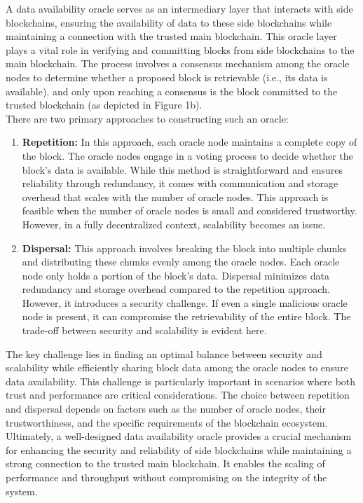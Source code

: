 A data availability oracle serves as an intermediary layer that interacts with side blockchains, ensuring the availability of data to these side blockchains while maintaining a connection with the trusted main blockchain. This oracle layer plays a vital role in verifying and committing blocks from side blockchains to the main blockchain. The process involves a consensus mechanism among the oracle nodes to determine whether a proposed block is retrievable (i.e., its data is available), and only upon reaching a consensus is the block committed to the trusted blockchain (as depicted in Figure 1b).\\
There are two primary approaches to constructing such an oracle:
\begin{enumerate}
	\item \textbf{Repetition:} In this approach, each oracle node maintains a complete copy of the block. The oracle nodes engage in a voting process to decide whether the block's data is available. While this method is straightforward and ensures reliability through redundancy, it comes with communication and storage overhead that scales with the number of oracle nodes. This approach is feasible when the number of oracle nodes is small and considered trustworthy. However, in a fully decentralized context, scalability becomes an issue.
	\item \textbf{Dispersal:} This approach involves breaking the block into multiple chunks and distributing these chunks evenly among the oracle nodes. Each oracle node only holds a portion of the block's data. Dispersal minimizes data redundancy and storage overhead compared to the repetition approach. However, it introduces a security challenge. If even a single malicious oracle node is present, it can compromise the retrievability of the entire block. The trade-off between security and scalability is evident here.
\end{enumerate}
The key challenge lies in finding an optimal balance between security and scalability while efficiently sharing block data among the oracle nodes to ensure data availability. This challenge is particularly important in scenarios where both trust and performance are critical considerations. The choice between repetition and dispersal depends on factors such as the number of oracle nodes, their trustworthiness, and the specific requirements of the blockchain ecosystem.\\
Ultimately, a well-designed data availability oracle provides a crucial mechanism for enhancing the security and reliability of side blockchains while maintaining a strong connection to the trusted main blockchain. It enables the scaling of performance and throughput without compromising on the integrity of the system.
